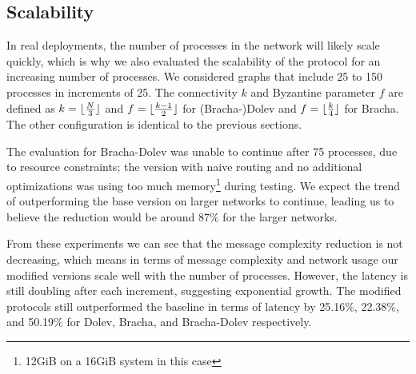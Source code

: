 \subsection{Scalability}
In real deployments, the number of processes in the network will likely scale quickly, which is why we also evaluated the scalability of the protocol for an increasing number of processes. We considered graphs that include 25 to 150 processes in increments of 25. The connectivity $k$ and Byzantine parameter $f$ are defined as $k=\lfloor\frac{N}{3}\rfloor$ and $f=\lfloor\frac{k-1}{2}\rfloor$ for (Bracha-)Dolev and $f=\lfloor\frac{k}{4}\rfloor$ for Bracha. The other configuration is identical to the previous sections.

The evaluation for Bracha-Dolev was unable to continue after 75 processes, due to resource constraints; the version with naive routing and no additional optimizations was using too much memory\footnote{12GiB on a 16GiB system in this case} during testing. 
We expect the trend of outperforming the base version on larger networks to continue, leading us to believe the reduction would be around 87\% for the larger networks.

From these experiments we can see that the message complexity reduction is not decreasing, which means in terms of message complexity and network usage our modified versions scale well with the number of processes. However, the latency is still doubling after each increment, suggesting exponential growth. The modified protocols still outperformed the baseline in terms of latency by 25.16\%, 22.38\%, and 50.19\% for Dolev, Bracha, and Bracha-Dolev respectively.


